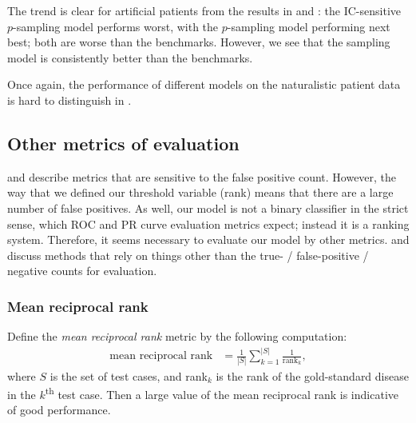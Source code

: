 The trend is clear for artificial patients from the results in  and :
the IC-sensitive $p$-sampling model performs worst, with the $p$-sampling model 
performing next best; both are worse than the benchmarks.
%
However, we see that the sampling model is consistently better than the benchmarks.

Once again, the performance of different models on the naturalistic patient data
is hard to distinguish in .

\subsection{Other metrics of evaluation}
%
 and   describe metrics
that are sensitive to the false positive count.
%
However, the way that we defined our threshold variable (rank) means that there are a
large number of false positives.
%
As well, our model is not a binary classifier in the strict sense, which ROC and PR curve
evaluation metrics expect; instead it is a ranking system.
%
Therefore, it seems necessary to evaluate our model by other metrics.
%
 and   discuss methods that
rely on things other than the true- / false-positive / negative counts for evaluation.

\subsubsection{Mean reciprocal rank}
\label{subsubsec:metricmrr}

Define the {\it mean reciprocal rank} metric by the following computation:
%
\begin{align*}
    \text{mean reciprocal rank}
    &= \frac{1}{|S|} \sum_{k=1}^{|S|} \frac{1}{\text{rank}_k},
\end{align*}
where $S$ is the set of test cases, and rank$_k$ is the rank of the gold-standard 
disease in the $k$\textsuperscript{th} test case.
%
Then a large value of the mean reciprocal rank is indicative of good performance.

